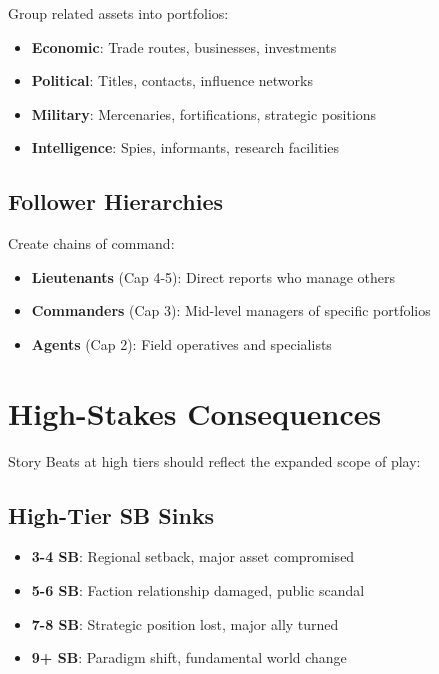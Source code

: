 Group related assets into portfolios:
\begin{itemize}
    \item \textbf{Economic}: Trade routes, businesses, investments
    \item \textbf{Political}: Titles, contacts, influence networks
    \item \textbf{Military}: Mercenaries, fortifications, strategic positions
    \item \textbf{Intelligence}: Spies, informants, research facilities
\end{itemize}

\subsection*{Follower Hierarchies}

Create chains of command:
\begin{itemize}
    \item \textbf{Lieutenants} (Cap 4-5): Direct reports who manage others
    \item \textbf{Commanders} (Cap 3): Mid-level managers of specific portfolios
    \item \textbf{Agents} (Cap 2): Field operatives and specialists
\end{itemize}

\section{High-Stakes Consequences}

Story Beats at high tiers should reflect the expanded scope of play:

\subsection*{High-Tier SB Sinks}

\begin{itemize}
    \item \textbf{3-4 SB}: Regional setback, major asset compromised
    \item \textbf{5-6 SB}: Faction relationship damaged, public scandal
    \item \textbf{7-8 SB}: Strategic position lost, major ally turned
    \item \textbf{9+ SB}: Paradigm shift, fundamental world change
\end{itemize}

